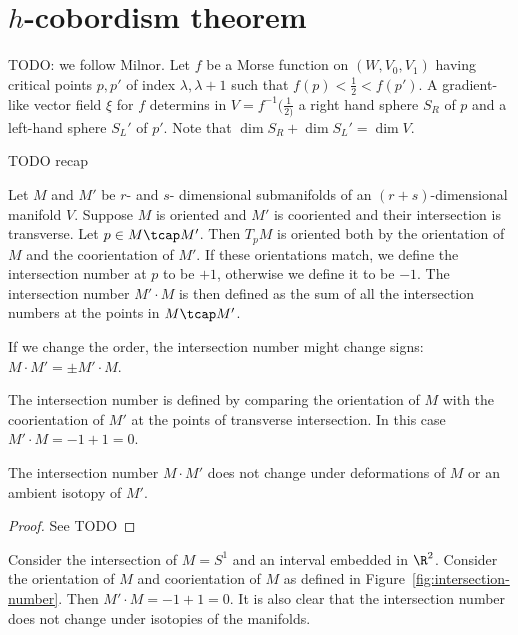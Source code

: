 \chapter{$h$-cobordism theorem}

TODO: we follow Milnor.
Let $f$ be a Morse function on  $(W, V_0, V_1)$ having critical points $p, p'$ of index $\lambda, \lambda+1$ such that  $f(p) < \frac{1}{2 } < f(p')$.
A gradient-like vector field $\xi$ for  $f$ determins in  $V = f^{-1}(\frac{1}{2)}$ a right hand sphere $S_R$ of  $p$ and a left-hand sphere  $S_L'$ of  $p'$.
Note that  $\dim S_R + \dim S_L' = \dim V$.

\begin{theorem}
    TODO recap
\end{theorem}



\begin{definition}
    Let $M$ and  $M'$ be $r$- and  $s$- dimensional submanifolds of an $(r+s)$-dimensional manifold $V$.
    Suppose $M$ is oriented and  $M'$ is cooriented and their intersection is transverse.
    Let $p \in  M \tcap M'$.
    Then $T_p M$ is oriented both by the orientation of  $M$ and the coorientation of  $M'$.
    If these orientations match, we define the intersection number at $p$ to be $+1$, otherwise we define it to be $-1$.
    The intersection number  $M' \cdot M$ is then defined as the sum of all the intersection numbers at the points in $M \tcap M'$.
\end{definition}
\begin{remark}
    If we change the order, the intersection number might change signs: $M \cdot M' =  \pm M' \cdot M$.
\end{remark}

\begin{marginfigure}
    \centering
    \caption{
        The intersection number is defined by comparing the orientation of $M$ with the coorientation of $M'$ at the points of transverse intersection. In this case $M' \cdot M = -1 + 1 = 0$.
    }
    \label{fig:intersection-number}
\end{marginfigure}
\begin{prop}
    The intersection number $M \cdot M'$ does not change under deformations of $M$ or an ambient isotopy of  $M'$.
\end{prop}
\begin{proof}
    See TODO
\end{proof}
\begin{eg}
    Consider the intersection of $M  = S^{1}$ and an interval embedded in $\R^2$. Consider the orientation of $M$ and coorientation of $M$ as defined in Figure~\ref{fig:intersection-number}. Then $M' \cdot M  = -1 + 1 = 0$.
    It is also clear that the intersection number does not change under isotopies of the manifolds.
\end{eg}

